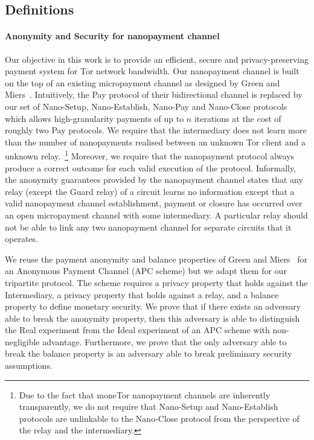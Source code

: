 
\subsection{Definitions}

\paragraph*{Anonymity and Security for nanopayment channel}
Our objective in this work is to provide an efficient, secure and
privacy-preserving payment system for Tor network bandwidth. Our nanopayment
channel is built on the top of an existing micropayment channel as designed by
Green and Miers~\cite{green2017bolt}. Intuitively, the Pay protocol of their
bidirectional channel is replaced by our set of Nano-Setup, Nano-Establish,
Nano-Pay and Nano-Close protocols which allows high-granularity payments of up
to $n$ iterations at the cost of roughly two Pay protocols.
We require that the intermediary does not learn more than the number of
nanopayments realised between an unknown Tor client and a unknown
relay.~\footnote{Due to the fact that moneTor nanopayment channels are
  inherently transparently, we do not require that Nano-Setup and Nano-Establish
  protocols are unlinkable to the Nano-Close protocol from the perspective of
  the relay and the intermediary.} Moreover, we require that the nanopayment
protocol always produce a correct outcome for each valid execution of the
protocol.  Informally, the anonymity guarantees provided by the nanopayment
channel states that any relay (except the Guard relay) of a circuit learns no
information except that a valid nanopayment channel establishment, payment or
closure has occurred over an open micropayment channel with some intermediary. A
particular relay should not be able to link any two nanopayment channel for
separate circuits that it operates.

We reuse the payment anonymity and balance properties of Green and
Miers~\cite{bolt-eprint} for an Anonymous Payment Channel (APC scheme) but we
adapt them for our tripartite protocol. The scheme requires a privacy property
that holds against the Intermediary, a privacy property that holds against a
relay, and a balance property to define monetary security.  We prove that if
there exists an adversary able to break the anonymity property, then this
adversary is able to distinguish the Real experiment from the Ideal experiment
of an APC scheme with non-negligible advantage. Furthermore, we prove that the
only adversary able to break the balance property is an adversary able to break
preliminary security assumptions.

